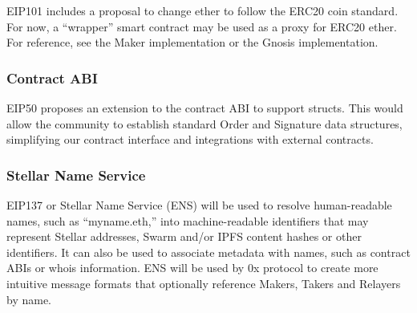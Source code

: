 \documentclass[conference]{IEEEtran}
\begin{document}
    EIP101 includes a proposal to change ether to follow the ERC20 coin standard. For now, a “wrapper” smart contract may be used as a proxy for ERC20 ether. For reference, see the Maker implementation or the Gnosis implementation.
    \subsubsection{Contract ABI}
    EIP50 proposes an extension to the contract ABI to support structs. This would allow the community to establish standard Order and Signature data structures, simplifying our contract interface and integrations with external contracts.
    \subsubsection{Stellar Name Service}
    EIP137 or Stellar Name Service (ENS) will be used to resolve human-readable names, such as “myname.eth,” into machine-readable identifiers that may represent Stellar addresses, Swarm and/or IPFS content hashes or other identifiers. It can also be used to associate metadata with names, such as contract ABIs or whois information. ENS will be used by 0x protocol to create more intuitive message formats that optionally reference Makers, Takers and Relayers by name.
 
    
    
    
    
    

    \printbibliography
   
    
\end{document}
